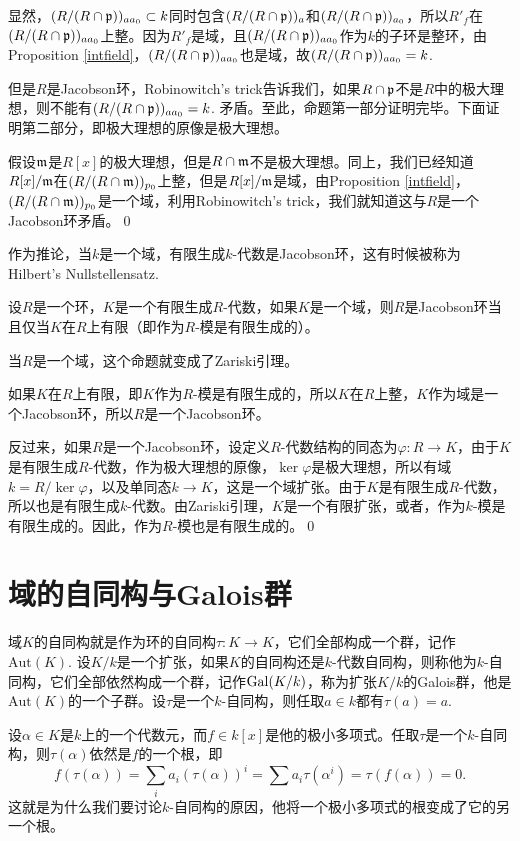 显然，$(R/(R\cap \mathfrak{p}))_{aa_0}\subset k$同时包含$(R/(R\cap \mathfrak{p}))_{a}$和$(R/(R\cap \mathfrak{p}))_{a_0}$，所以$R'_f$在$(R/(R\cap \mathfrak{p}))_{aa_0}$上整。因为$R'_f$是域，且$(R/(R\cap \mathfrak{p}))_{aa_0}$作为$k$的子环是整环，由Proposition \eqref{intfield}，$(R/(R\cap \mathfrak{p}))_{aa_0}$也是域，故$(R/(R\cap \mathfrak{p}))_{aa_0}=k$.

但是$R$是Jacobson环，Robinowitch's trick告诉我们，如果$R\cap \mathfrak{p}$不是$R$中的极大理想，则不能有$(R/(R\cap \mathfrak{p}))_{aa_0}=k$. 矛盾。至此，命题第一部分证明完毕。下面证明第二部分，即极大理想的原像是极大理想。

假设$\mathfrak{m}$是$R[x]$的极大理想，但是$R\cap \mathfrak{m}$不是极大理想。同上，我们已经知道$R[x]/\mathfrak{m}$在$(R/(R\cap \mathfrak{m}))_{p_0}$上整，但是$R[x]/\mathfrak{m}$是域，由Proposition \eqref{intfield}，$(R/(R\cap \mathfrak{m}))_{p_0}$是一个域，利用Robinowitch's trick，我们就知道这与$R$是一个Jacobson环矛盾。\qed

作为推论，当$k$是一个域，有限生成$k$-代数是Jacobson环，这有时候被称为Hilbert's Nullstellensatz.

\pro 设$R$是一个环，$K$是一个有限生成$R$-代数，如果$K$是一个域，则$R$是Jacobson环当且仅当$K$在$R$上有限（即作为$R$-模是有限生成的）。

当$R$是一个域，这个命题就变成了Zariski引理。

\proof 如果$K$在$R$上有限，即$K$作为$R$-模是有限生成的，所以$K$在$R$上整，$K$作为域是一个Jacobson环，所以$R$是一个Jacobson环。

反过来，如果$R$是一个Jacobson环，设定义$R$-代数结构的同态为$\varphi:R\to K$，由于$K$是有限生成$R$-代数，作为极大理想的原像，$\ker\varphi$是极大理想，所以有域$k=R/\ker\varphi$，以及单同态$k\to K$，这是一个域扩张。由于$K$是有限生成$R$-代数，所以也是有限生成$k$-代数。由Zariski引理，$K$是一个有限扩张，或者，作为$k$-模是有限生成的。因此，作为$R$-模也是有限生成的。\qed

\section{域的自同构与Galois群}

\para 域$K$的自同构就是作为环的自同构$\tau:K\to K$，它们全部构成一个群，记作$\mathrm{Aut}(K)$. 设$K/k$是一个扩张，如果$K$的自同构还是$k$-代数自同构，则称他为$k$-自同构，它们全部依然构成一个群，记作$\operatorname{Gal}(K/k)$，称为扩张$K/k$的Galois群，他是$\mathrm{Aut}(K)$的一个子群。设$\tau$是一个$k$-自同构，则任取$a\in k$都有$\tau(a)=a$.

设$\alpha\in K$是$k$上的一个代数元，而$f\in k[x]$是他的极小多项式。任取$\tau$是一个$k$-自同构，则$\tau(\alpha)$依然是$f$的一个根，即
\[
	f(\tau(\alpha))=\sum_i a_i (\tau(\alpha))^i=\sum a_i \tau(\alpha^i)=\tau(f(\alpha))=0.
\]
这就是为什么我们要讨论$k$-自同构的原因，他将一个极小多项式的根变成了它的另一个根。

